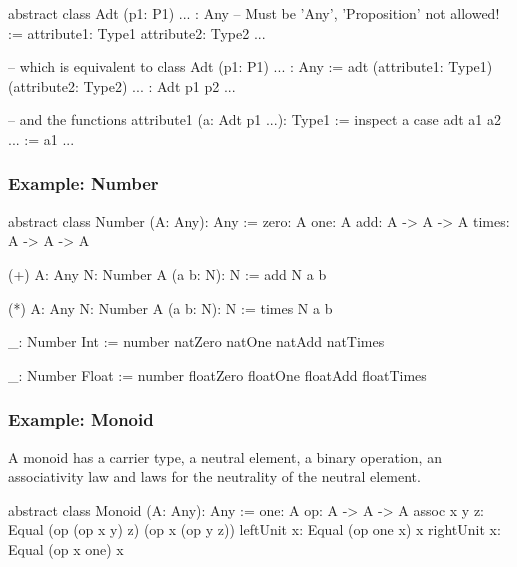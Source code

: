 \begin{alba}
    abstract class
        Adt (p1: P1) ... : Any   -- Must be 'Any', 'Proposition' not allowed!
    :=
        attribute1: Type1
        attribute2: Type2
        ...

    -- which is equivalent to
    class
        Adt (p1: P1) ... : Any
    :=
        adt (attribute1: Type1) (attribute2: Type2) ... : Adt p1 p2 ...

    -- and the functions
    attribute1 (a: Adt p1 ...): Type1 :=
        inspect a case
            adt a1 a2 ... := a1
    ...
\end{alba}








\subsubsection{Example: Number}

\begin{alba}
    abstract class
        Number (A: Any): Any
    :=
        zero: A
        one:  A
        add:   A -> A -> A
        times: A -> A -> A

    (+) {A: Any} {N: Number A} (a b: N): N :=
        add N a b

    (*) {A: Any} {N: Number A} (a b: N): N :=
        times N a b

    _: Number Int :=
        number natZero natOne natAdd natTimes

    _: Number Float :=
        number floatZero floatOne floatAdd floatTimes
\end{alba}










\subsubsection{Example: Monoid}

A monoid has a carrier type, a neutral element, a binary operation, an
associativity law and laws for the neutrality of the neutral element.

\begin{alba}
    abstract class
        Monoid (A: Any): Any
    :=
        one:
            A
        op:
            A -> A -> A
        assoc {x y z}:
            Equal (op (op x y) z) (op x (op y z))
        leftUnit {x}:
            Equal (op one x) x
        rightUnit {x}:
            Equal (op x one) x
\end{alba}




